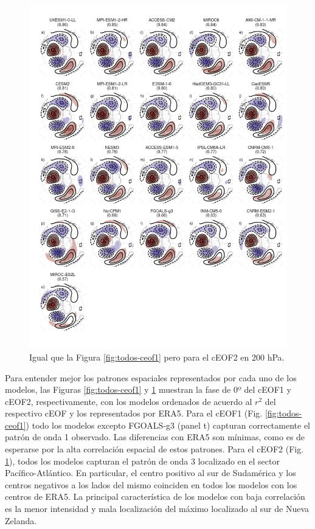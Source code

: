 \documentclass[12pt,oneside,a4paper]{reedthesis}
\begin{document}
\begin{figure}

{\centering \includegraphics{figures/50-cmip6/todos-ceof2-1} 

}

\caption{Igual que la Figura \ref{fig:todos-ceof1} pero para el cEOF2 en 200 hPa.}\label{fig:todos-ceof2}
\end{figure}



Para entender mejor los patrones espaciales representados por cada uno de los modelos, las Figuras \ref{fig:todos-ceof1} y \ref{fig:todos-ceof2} muestran la fase de 0º del cEOF1 y cEOF2, respectivamente, con los modelos ordenados de acuerdo al \(r^2\) del respectivo cEOF y los representados por ERA5.
Para el cEOF1 (Fig. \ref{fig:todos-ceof1}) todo los modelos excepto FGOALS-g3 (panel t) capturan correctamente el patrón de onda 1 observado.
Las diferencias con ERA5 son mínimas, como es de esperarse por la alta correlación espacial de estos patrones.
Para el cEOF2 (Fig. \ref{fig:todos-ceof2}), todos los modelos capturan el patrón de onda 3 localizado en el sector Pacífico-Atlántico.
En particular, el centro positivo al sur de Sudamérica y los centros negativos a los lados del mismo coinciden en todos los modelos con los centros de ERA5.
La principal característica de los modelos con baja correlación es la menor intensidad y mala localización del máximo localizado al sur de Nueva Zelanda.
\end{document}

